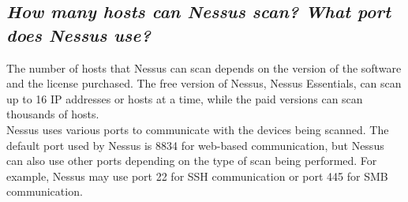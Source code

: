 \documentclass{article}
\begin{document}
\subsection{\textit{How many hosts can Nessus scan? What port does Nessus use?}}
The number of hosts that Nessus can scan depends on the version of the software and the license purchased. The free version of Nessus, Nessus Essentials, can scan up to 16 IP addresses or hosts at a time, while the paid versions can scan thousands of hosts.\\

Nessus uses various ports to communicate with the devices being scanned. The default port used by Nessus is 8834 for web-based communication, but Nessus can also use other ports depending on the type of scan being performed. For example, Nessus may use port 22 for SSH communication or port 445 for SMB communication.
\end{document}
